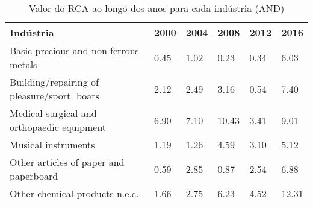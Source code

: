 \begin{table}
\centering
\caption{Valor do RCA ao longo dos anos para cada indústria (AND)}
\begin{tabular}{p{6cm}p{1.5cm}p{1.5cm}p{1.5cm}p{1.5cm}p{1.5cm}}
\toprule
                                  Indústria & 2000 & 2004 &  2008 & 2012 &  2016 \\
\midrule
      Basic precious and non-ferrous metals & 0.45 & 1.02 &  0.23 & 0.34 &  6.03 \\
Building/repairing of pleasure/sport. boats & 2.12 & 2.49 &  3.16 & 0.54 &  7.40 \\
 Medical surgical and orthopaedic equipment & 6.90 & 7.10 & 10.43 & 3.41 &  9.01 \\
                        Musical instruments & 1.19 & 1.26 &  4.59 & 3.10 &  5.12 \\
     Other articles of paper and paperboard & 0.59 & 2.85 &  0.87 & 2.54 &  6.88 \\
             Other chemical products n.e.c. & 1.66 & 2.75 &  6.23 & 4.52 & 12.31 \\
\bottomrule
\end{tabular}
\end{table}
